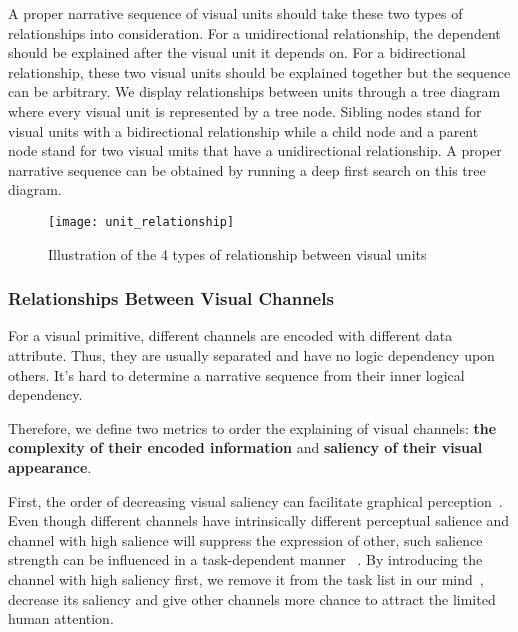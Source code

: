 A proper narrative sequence of visual units should take these two types of relationships into consideration. For a unidirectional relationship, the dependent should be explained after the visual unit it depends on. For a bidirectional relationship, these two visual units should be explained together but the sequence can be arbitrary. 
We display relationships between units through a tree diagram where every visual unit is represented by a tree node. Sibling nodes stand for visual units with a bidirectional relationship while a child node and a parent node stand for two visual units that have a unidirectional relationship. A proper narrative sequence can be obtained by running a deep first search on this tree diagram. 



\begin{figure}[tb]
 \centering %
 \texttt{[image: unit\_relationship]}
 \caption{Illustration of the 4 types of relationship between visual units}
 \label{fig:unit_relationship}
\end{figure}

\subsubsection{Relationships Between Visual Channels}
For a visual primitive, different channels are encoded with different data attribute. Thus, they are usually separated and have no logic dependency upon others. It's hard to determine a narrative sequence from their inner logical dependency. 

Therefore, we define two metrics to order the explaining of visual channels: \textbf{the complexity of their encoded information} and \textbf{saliency of their visual appearance}.

First, the order of decreasing visual saliency can facilitate graphical perception~\cite{cleveland_graphical_1984}. Even though different channels have intrinsically different perceptual salience and channel with high salience will suppress the expression of other, such salience strength can be influenced in a task-dependent manner ~\cite{nothdurft_salience_2000}. By introducing the channel with high saliency first, we remove it from the task list in our mind~\cite{itti2001computational}, decrease its saliency and give other channels more chance to attract the limited human attention. 

